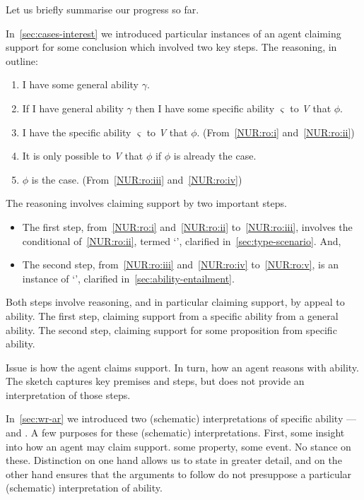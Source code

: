 \begin{note}
  Let us briefly summarise our progress so far.

  In~\autoref{sec:cases-interest} we introduced particular instances of an agent claiming support for some conclusion which involved two key steps.
  The reasoning, in outline:
  \begin{enumerate}[label=\arabic*., ref=(\arabic*)]
  \item\label{NUR:ro:i} I have some general ability \(\gamma\).
  \item\label{NUR:ro:ii} If I have general ability \(\gamma\) then I have some specific ability \(\varsigma\) to \emph{V} that \(\phi\).
  \item\label{NUR:ro:iii} I have the specific ability \(\varsigma\) to \emph{V} that \(\phi\). \hfill (From~\ref{NUR:ro:i} and~\ref{NUR:ro:ii})
  \item\label{NUR:ro:iv} It is only possible to \emph{V} that \(\phi\) if \(\phi\) is already the case.
  \item\label{NUR:ro:v} \(\phi\) is the case. \hfill (From~\ref{NUR:ro:iii} and~\ref{NUR:ro:iv})
  \end{enumerate}

  The reasoning involves claiming support by two important steps.

  \begin{itemize}
  \item The first step, from~\ref{NUR:ro:i} and~\ref{NUR:ro:ii} to~\ref{NUR:ro:iii}, involves the conditional of~\ref{NUR:ro:ii}, termed `\gsi{-}', clarified in~\autoref{sec:type-scenario}. And,
  \item The second step, from~\ref{NUR:ro:iii} and~\ref{NUR:ro:iv} to~\ref{NUR:ro:v}, is an instance of `', clarified in~\autoref{sec:ability-entailment}.
  \end{itemize}

  Both steps involve reasoning, and in particular claiming support, by appeal to ability.
  The first step, claiming support from a specific ability from a general ability.
  The second step, claiming support for some proposition from specific ability.

  Issue is how the agent claims support.
  In turn, how an agent reasons with ability.
  The sketch captures key premises and steps, but does not provide an interpretation of those steps.

  In~\autoref{sec:wr-ar} we introduced two (schematic) interpretations of specific ability --- \AR{} and \WR{}.
  A few purposes for these (schematic) interpretations.
  First, some insight into how an agent may claim support.
  \AR{} some property, \WR{} some event.
  No stance on these.
  Distinction on one hand allows us to state in greater detail, and on the other hand ensures that the arguments to follow do not presuppose a particular (schematic) interpretation of ability.


\end{note}
